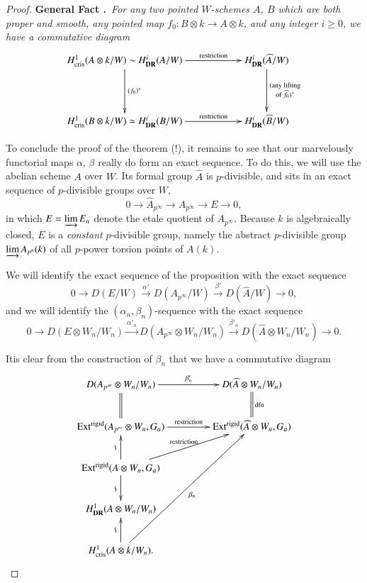 \begin{proof}
\medskip
\noindent
{\bf General Fact .\label{art6-5.7.6}}~{\em For any two pointed $W$-schemes $A$, $B$ which are both proper and smooth, any pointed map $f_{0}:B\otimes k\to A\otimes k$, and any integer $i\geq 0$, we have a commutative diagram}
\begin{equation*}
\xymatrix@C=2cm@R=1.5cm{
H^{1}_{\text{cris}}(A\otimes k/W)\sim H^{i}_{\DR}(A/W) \ar[r]^-{\text{restriction}} \ar[d]^-{(f_{0})^{*}} & H^{i}_{\DR}(\widehat{A}/W)\ar[d]^-{\substack{\text{(any lifting}\\ \text{of $\widehat{f}_{0}$)$^{*}$}}}\\
H^{1}_{\text{cris}}(B\otimes k/W)\simeq H^{i}_{\DR}(B/W)\ar[r]^-{\text{restriction}} & H^{i}_{\DR}(\widehat{B}/W)
}
\end{equation*}

To conclude the proof of the theorem (!), it remains to see that our marvelously functorial maps $\alpha$, $\beta$ really do form an exact sequence. To do this, we will use the abelian scheme $A$ over $W$. Its formal group $\widehat{A}$ is $p$-divisible, and sits in an exact sequence of $p$-divisible groups over $W$,
$$
0\to \widehat{A}_{p^{\infty}}\to A_{p^{\infty}}\to E\to 0,
$$
in which $E=\varinjlim E_{n}$ denote the etale quotient of $A_{p^{\infty}}$. Because $k$ is algebraically closed, $E$ is a {\em constant} $p$-divisible group, namely the abstract $p$-divisible group $\varinjlim A_{p^{n}}(k)$ of all $p$-power torsion points of $A(k)$.

We will identify the exact sequence of the proposition with the exact sequence
$$
0\to D(E/W)\xrightarrow{\alpha'}D(A_{p^{\infty}}/W)\xrightarrow{\beta'}D(\widehat{A}/W)\to 0,
$$
and we will identify the $(\alpha_{n},\beta_{n})$-sequence with the exact sequence
$$
0\to D(E\otimes W_{n}/W_{n})\xrightarrow{\alpha'_{n}}D(A_{p^{\infty}}\otimes W_{n}/W_{n})\xrightarrow{\beta'_{n}}D(\widehat{A}\otimes W_{n}/W_{n})\to 0.
$$

It\pageoriginale is clear from the construction of $\beta_{n}$ that we have a commutative diagram
\[
\xymatrix@C=1.5cm{
D(A_{p^{\infty}}\otimes W_{n}/W_{n})\ar@{=}[d]\ar[r]^-{\beta'_{n}} & D(\widehat{A}\otimes W_{n}/W_{n})\ar@{=}[d]^-{\text{dfn}}\\
\Ext^{\text{rigid}}(A_{p^{\infty}}\otimes W_{n},G_{a})\ar[r]^-{\text{restriction}} & \Ext^{\text{rigid}}(\widehat{A}\otimes W_{n},G_{a})\\
\Ext^{\text{rigid}}(A\otimes W_{n},G_{a})\ar[u]^{\rotatebox{90}{$\backsim$}}\ar[d]_{\rotatebox{90}{$\backsim$}}\ar[ur]^-{\text{restriction}}  &\\
H^{1}_{\DR}(A\otimes W_{n}/W_{n}) &\\
H^{1}_{\text{cris}}(A\otimes k/W_{n}).\ar[u]^{\rotatebox{90}{$\backsim$}} \ar[uuur]_{\beta_{n}}
}
\]


\end{proof}
